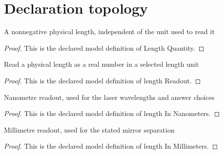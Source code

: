 \section{Declaration topology}
\begin{definition}
  \label{def:physics:phyx-mini-0245:phyxminiproblems-problemphyxmini0245-lengthquantity}
  A nonnegative physical length, independent of the unit used to read it
\end{definition}
\begin{proof}
  This is the declared model definition of Length Quantity.
\end{proof}
\begin{definition}
  \label{def:physics:phyx-mini-0245:phyxminiproblems-problemphyxmini0245-lengthreadout}
  Read a physical length as a real number in a selected length unit
\end{definition}
\begin{proof}
  This is the declared model definition of length Readout.
\end{proof}
\begin{definition}
  \label{def:physics:phyx-mini-0245:phyxminiproblems-problemphyxmini0245-lengthinnanometers}
  Nanometre readout, used for the laser wavelengths and answer choices
\end{definition}
\begin{proof}
  This is the declared model definition of length In Nanometers.
\end{proof}
\begin{definition}
  \label{def:physics:phyx-mini-0245:phyxminiproblems-problemphyxmini0245-lengthinmillimeters}
  Millimetre readout, used for the stated mirror separation
\end{definition}
\begin{proof}
  This is the declared model definition of length In Millimeters.
\end{proof}
